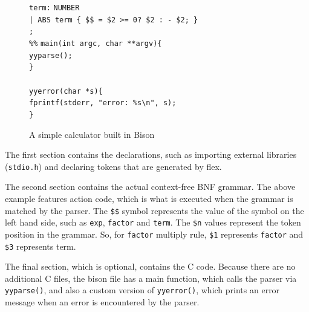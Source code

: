 \documentclass[12pt]{report}
\begin{document}
	\begin{figure}[H]
	\begin{tabbing}
	\ContinuedFloat
	\texttt{term:} \= \texttt{NUMBER}\\
	\> \texttt{| ABS term \{ \$\$ = \$2 >= 0? \$2 : - \$2; \}}\\
	\> \texttt{;}\\
	\texttt{\%\%}
	\texttt{main}\=\texttt{(int argc, char **argv)\{}\\
	\> \texttt{yyparse();}\\
	\texttt{\}}\\
	\\
	\texttt{yyerror(char *s)\{}\\
	\> \texttt{fprintf(stderr, "error: \%s\textbackslash n", s);}\\
	\texttt{\}}
	\end{tabbing}
	\caption{A simple calculator built in Bison}\label{fig:bison_example}
\end{figure}
The first section contains the declarations, such as importing external libraries (\texttt{stdio.h}) and declaring tokens that are generated by flex.

The second section contains the actual context-free BNF grammar.  The above example features action code, which is what is executed when the grammar is matched by the parser.  The \texttt{\$\$} symbol represents the value of the symbol on the left hand side, such as \texttt{exp}, \texttt{factor} and \texttt{term}.  The \texttt{\$n} values represent the token position in the grammar.  So, for \texttt{factor} multiply rule, \texttt{\$1} represents \texttt{factor} and \texttt{\$3} represents term.

The final section, which is optional, contains the C code.  Because there are no additional C files, the bison file has a main function, which calls the parser via \texttt{yyparse()}, and also a custom version of \texttt{yyerror()}, which prints an error message when an error is encountered by the parser.
\end{document}
